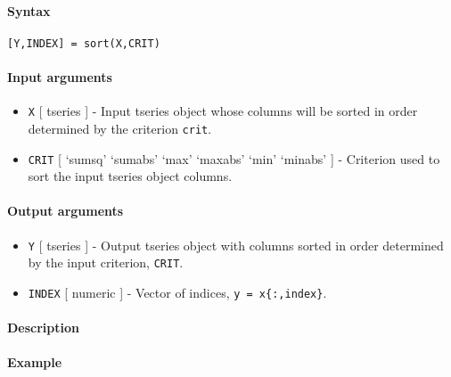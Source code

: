 


	\paragraph{Syntax}\label{syntax}

\begin{verbatim}
[Y,INDEX] = sort(X,CRIT)
\end{verbatim}

\paragraph{Input arguments}\label{input-arguments}

\begin{itemize}
\item
  \texttt{X} {[} tseries {]} - Input tseries object whose columns will
  be sorted in order determined by the criterion \texttt{crit}.
\item
  \texttt{CRIT} {[} `sumsq' \textbar{} `sumabs' \textbar{} `max'
  \textbar{} `maxabs' \textbar{} `min' \textbar{} `minabs' {]} -
  Criterion used to sort the input tseries object columns.
\end{itemize}

\paragraph{Output arguments}\label{output-arguments}

\begin{itemize}
\item
  \texttt{Y} {[} tseries {]} - Output tseries object with columns sorted
  in order determined by the input criterion, \texttt{CRIT}.
\item
  \texttt{INDEX} {[} numeric {]} - Vector of indices,
  \texttt{y = x\{:,index\}}.
\end{itemize}

\paragraph{Description}\label{description}

\paragraph{Example}\label{example}


